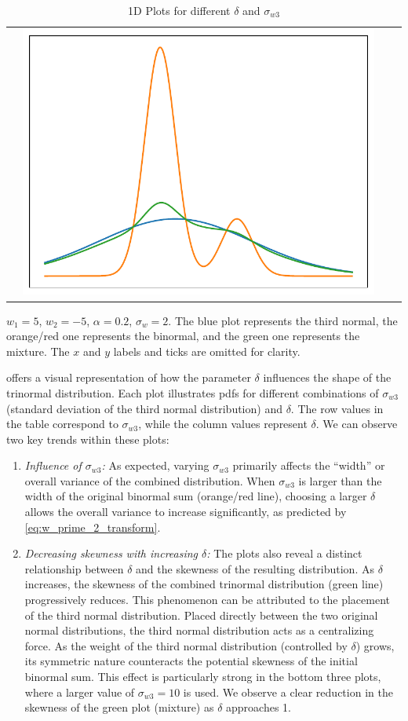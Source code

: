 \begin{table}[!htb]
\begin{tabularx}{\textwidth}{c|@{}Y@{}@{}Y@{}@{}Y@{}}
        & \includegraphics[width = .29\textwidth]{include/figures/1dplotslw100_delta9}
    \end{tabularx}
    \caption{1D Plots for different $\delta$ and $\sigma_{w3}$}
    $w_1 = 5$, $w_2 = -5$, $\alpha = 0.2$, $\sigma_w = 2$.
    The blue plot represents the third normal,
    the orange/red one represents the binormal,
    and the green one represents the mixture.
    The $x$ and $y$ labels and ticks are omitted for clarity.
    \label{tab:1dplotbitri}
\end{table}
 offers a visual representation of how the parameter $\delta$ influences
the shape of the trinormal distribution.
Each plot illustrates \glspl{pdf} for different combinations of $\sigma_{w 3}$
(standard deviation of the third normal distribution) and $\delta$.
The row values in the table correspond to $\sigma_{w 3}$,
while the column values represent $\delta$.
We can observe two key trends within these plots:
\begin{enumerate}
    \item \emph{Influence of $\sigma_{w3}$:}
    As expected, varying $\sigma_{w3}$ primarily affects the \enquote{width}
    or overall variance of the combined distribution.
    When $\sigma_{w3}$ is larger than the width of the original binormal sum (orange/red line),
    choosing a larger $\delta$ allows the overall variance to increase significantly,
    as predicted by \cref{eq:w_prime_2_transform}.

    \item \emph{Decreasing skewness with increasing $\delta$:}
    The plots also reveal a distinct relationship between $\delta$
    and the skewness of the resulting distribution.
    As $\delta$ increases,
    the skewness of the combined trinormal distribution (green line) progressively reduces.
    This phenomenon can be attributed to the placement of the third normal distribution.
    Placed directly between the two original normal distributions,
    the third normal distribution acts as a centralizing force.
    As the weight of the third normal distribution (controlled by $\delta$) grows,
    its symmetric nature counteracts the potential skewness of the initial binormal sum.
    This effect is particularly strong in the bottom three plots,
    where a larger value of $\sigma_{w 3} = 10$ is used.
    We observe a clear reduction in the skewness of the green plot (mixture) as $\delta$ approaches 1.
\end{enumerate}
